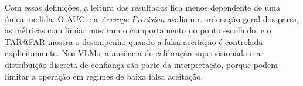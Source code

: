 Com essas definições, a leitura dos resultados fica menos dependente de uma única medida. O AUC e a \textit{Average Precision} avaliam a ordenação geral dos pares, as métricas com limiar mostram o comportamento no ponto escolhido, e o TAR@FAR mostra o desempenho quando a falsa aceitação é controlada explicitamente. Nos VLMs, a ausência de calibração supervisionada e a distribuição discreta de confiança são parte da interpretação, porque podem limitar a operação em regimes de baixa falsa aceitação.
